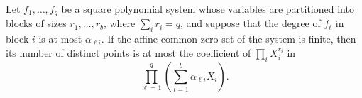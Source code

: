 Let \(f_1,\ldots,f_q\) be a square polynomial system whose variables are partitioned into blocks of sizes \(r_1,\ldots,r_b\), where \(\sum_i r_i=q\), and suppose that the degree of \(f_\ell\) in block \(i\) is at most \(\alpha_{\ell i}\). If the affine common-zero set of the system is finite, then its number of distinct points is at most the coefficient of \(\prod_i X_i^{r_i}\) in
\[
 \prod_{\ell=1}^{q}\left(\sum_{i=1}^{b}\alpha_{\ell i}X_i\right).
\]

